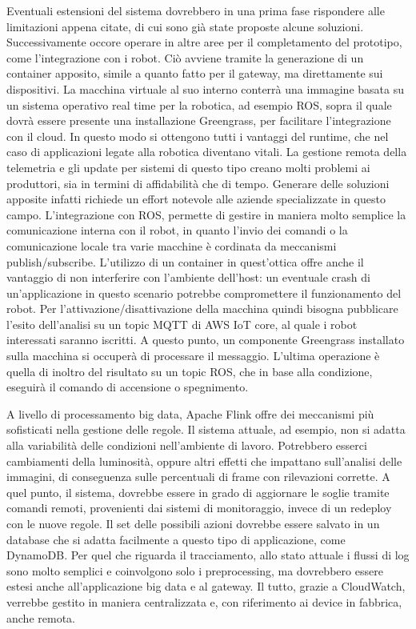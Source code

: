 Eventuali estensioni del sistema dovrebbero in una prima fase rispondere alle limitazioni appena citate, di cui sono già state proposte alcune soluzioni. Successivamente occore operare in altre aree per il completamento del prototipo, come l'integrazione con i robot. Ciò avviene tramite la generazione di un container apposito, simile a quanto fatto per il gateway, ma direttamente sui dispositivi. La macchina virtuale al suo interno conterrà una immagine basata su un sistema operativo real time per la robotica, ad esempio ROS, sopra il quale dovrà essere presente una installazione Greengrass, per facilitare l'integrazione con il cloud. In questo modo si ottengono tutti i vantaggi del runtime, che nel caso di applicazioni legate alla robotica diventano vitali. La gestione remota della telemetria e gli update per sistemi di questo tipo creano molti problemi ai produttori, sia in termini di affidabilità che di tempo. Generare delle soluzioni apposite infatti richiede un effort notevole alle aziende specializzate in questo campo. L'integrazione con ROS, permette di gestire in maniera molto semplice la comunicazione interna con il robot, in quanto l'invio dei comandi o la comunicazione locale tra varie macchine è cordinata da meccanismi publish/subscribe. L'utilizzo di un container in quest'ottica offre anche il vantaggio di non interferire con l'ambiente dell'host: un eventuale crash di un'applicazione in questo scenario potrebbe compromettere il funzionamento del robot. Per l'attivazione/disattivazione della macchina quindi bisogna pubblicare l'esito dell'analisi su un topic MQTT di AWS IoT core, al quale i robot interessati saranno iscritti. A questo punto, un componente Greengrass installato sulla macchina si occuperà di processare il messaggio. L'ultima operazione è quella di inoltro del risultato su un topic ROS, che in base alla condizione, eseguirà il comando di accensione o spegnimento.

A livello di processamento big data, Apache Flink offre dei meccanismi più sofisticati nella gestione delle regole. Il sistema attuale, ad esempio, non si adatta alla variabilità delle condizioni nell'ambiente di lavoro. Potrebbero esserci cambiamenti della luminosità, oppure altri effetti che impattano sull'analisi delle immagini, di conseguenza sulle percentuali di frame con rilevazioni corrette. A quel punto, il sistema, dovrebbe essere in grado di aggiornare le soglie tramite comandi remoti, provenienti dai sistemi di monitoraggio, invece di un redeploy con le nuove regole. Il set delle possibili azioni dovrebbe essere salvato in un database che si adatta facilmente a questo tipo di applicazione, come DynamoDB. Per quel che riguarda il tracciamento, allo stato attuale i flussi di log sono molto semplici e coinvolgono solo i preprocessing, ma dovrebbero essere estesi anche all'applicazione big data e al gateway. Il tutto, grazie a CloudWatch, verrebbe gestito in maniera centralizzata e, con riferimento ai device in fabbrica, anche remota. 

